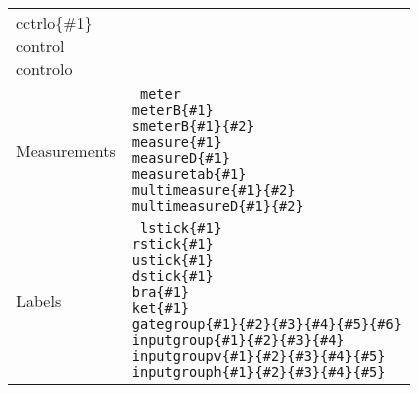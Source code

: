 \documentclass[twocolumn,nofootinbib]{revtex4}
\begin{document}
{\begin{center}
\begin{tabular}{l | l }
{                    \char92 cctrlo\{\#1\} \\
                    \char92 control \\
                    \char92 controlo } \\
        Measurements & \parbox[t]{6cm}{\tt
                     meter \\
                     meterB\{\#1\} \\
                     smeterB\{\#1\}\{\#2\} \\
                     measure\{\#1\} \\
                     measureD\{\#1\} \\
                     measuretab\{\#1\} \\
                     multimeasure\{\#1\}\{\#2\} \\
                     multimeasureD\{\#1\}\{\#2\} } \\
        Labels & \parbox[t]{6cm}{\tt
                     lstick\{\#1\} \\
                     rstick\{\#1\} \\
                     ustick\{\#1\} \\
                     dstick\{\#1\} \\
                     bra\{\#1\} \\
                     ket\{\#1\} \\
                     gategroup\{\#1\}\{\#2\}\{\#3\}\{\#4\}\{\#5\}\{\#6\}\\
                     inputgroup\{\#1\}\{\#2\}\{\#3\}\{\#4\}\\
                     inputgroupv\{\#1\}\{\#2\}\{\#3\}\{\#4\}\{\#5\}\\
                     inputgrouph\{\#1\}\{\#2\}\{\#3\}\{\#4\}\{\#5\}\\
                    }
    \end{tabular}
\end{center}}
\end{document}
